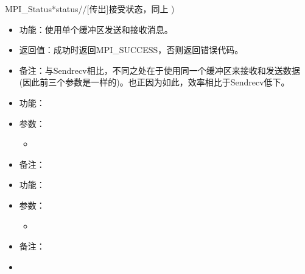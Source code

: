 \documentclass[UTF8]{article}%
\begin{document}
    \qquad MPI\_Status*status//[传出]接受状态，同上
)

\begin{itemize}
    \item 功能：使用单个缓冲区发送和接收消息。
    \item 返回值：成功时返回MPI\_SUCCESS，否则返回错误代码。
    \item 备注：与Sendrecv相比，不同之处在于使用同一个缓冲区来接收和发送数据(因此前三个参数是一样的)。也正因为如此，效率相比于Sendrecv低下。
\end{itemize}




\begin{itemize}
    \item 功能：
    \item 参数：
    {
        \begin{itemize}
            \item 
        \end{itemize}
    }
    \item 备注：
\end{itemize}

\begin{itemize}
    \item 功能：
    \item 参数：
    {
        \begin{itemize}
            \item 
        \end{itemize}
    }
    \item 备注：
\end{itemize}












\begin{itemize}
    \item 
\end{itemize}
\end{document}
